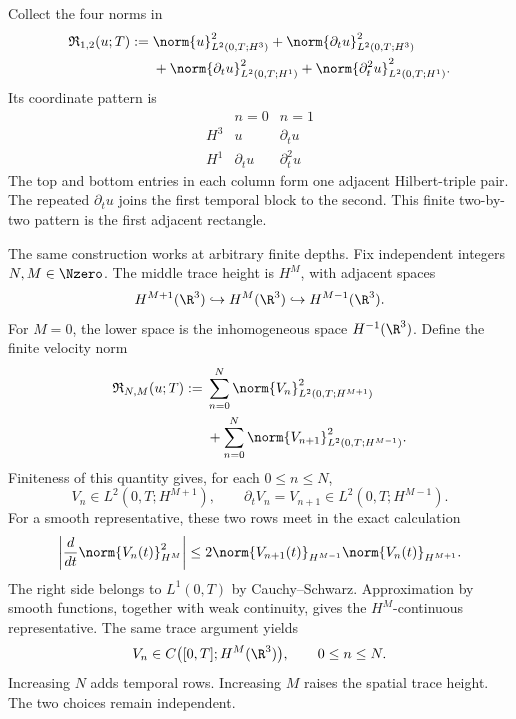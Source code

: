 Collect the four norms in
\begin{align*}
  \mathfrak R_{1,2}(u;T)
  :={}&
  \norm{u}_{L^2(0,T;H^3)}^2
  +
  \norm{\partial_tu}_{L^2(0,T;H^3)}^2
  \\
  &+
  \norm{\partial_tu}_{L^2(0,T;H^1)}^2
  +
  \norm{\partial_t^2u}_{L^2(0,T;H^1)}^2.
\end{align*}
Its coordinate pattern is
\[
  \begin{array}{c|cc}
    & n=0 & n=1
    \\
    \hline
    H^3
    & u & \partial_tu
    \\
    H^1
    & \partial_tu & \partial_t^2u
  \end{array}
\]
The top and bottom entries in each column form one adjacent Hilbert-triple pair.
The repeated \(\partial_tu\) joins the first temporal block to the second.
This finite two-by-two pattern is the first adjacent rectangle.

The same construction works at arbitrary finite depths.
Fix independent integers \(N,M\in\Nzero\).
The middle trace height is \(H^M\), with adjacent spaces
\[
  H^{M+1}(\R^3)
  \hookrightarrow
  H^M(\R^3)
  \hookrightarrow
  H^{M-1}(\R^3).
\]
For \(M=0\), the lower space is the inhomogeneous space \(H^{-1}(\R^3)\).
Define the finite velocity norm
\begin{align*}
  \mathfrak R_{N,M}(u;T)
  :={}&
  \sum_{n=0}^{N}
  \norm{V_n}_{L^2(0,T;H^{M+1})}^{2}
  \\
  &+
  \sum_{n=0}^{N}
  \norm{V_{n+1}}_{L^2(0,T;H^{M-1})}^{2}.
\end{align*}
Finiteness of this quantity gives, for each \(0\leq n\leq N\),
\[
  V_n\in L^2(0,T;H^{M+1}),
  \qquad
  \partial_tV_n=V_{n+1}\in L^2(0,T;H^{M-1}).
\]
For a smooth representative, these two rows meet in the exact calculation
\[
  \left|
    \frac{d}{dt}
    \norm{V_n(t)}_{H^M}^{2}
  \right|
  \leq
  2
  \norm{V_{n+1}(t)}_{H^{M-1}}
  \norm{V_n(t)}_{H^{M+1}}.
\]
The right side belongs to \(L^1(0,T)\) by Cauchy--Schwarz.
Approximation by smooth functions, together with weak continuity, gives the \(H^M\)-continuous representative.
The same trace argument yields
\[
  V_n
  \in
  C\bigl([0,T];H^M(\R^3)\bigr),
  \qquad
  0\leq n\leq N.
\]
Increasing \(N\) adds temporal rows.
Increasing \(M\) raises the spatial trace height.
The two choices remain independent.

